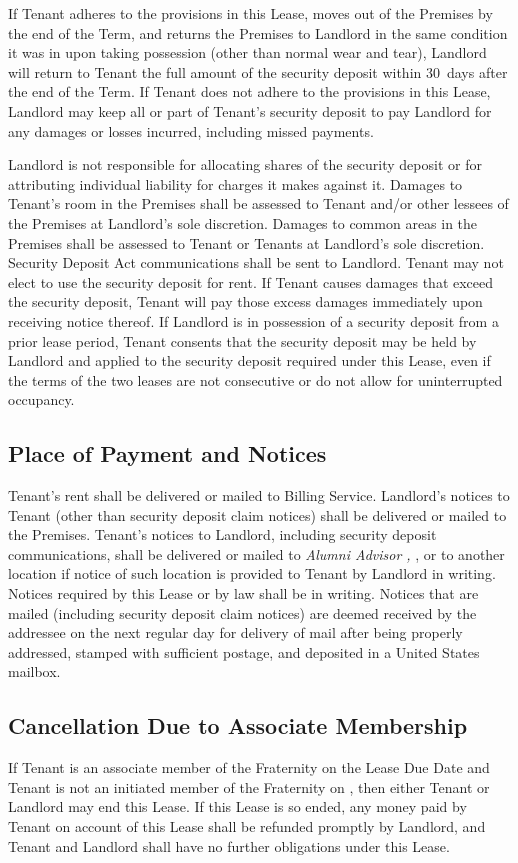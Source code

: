 \documentclass{article}
\begin{document}
If Tenant adheres to the provisions in this Lease, moves out of the Premises by
the end of the Term, and returns the Premises to Landlord in the same condition
it was in upon taking possession (other than normal wear and tear), Landlord
will return to Tenant the full amount of the security deposit within 30~days
after the end of the Term. If Tenant does not adhere to the provisions in this
Lease, Landlord may keep all or part of Tenant’s security deposit to pay
Landlord for any damages or losses incurred, including missed payments.

Landlord is not responsible for allocating shares of the security deposit or for
attributing individual liability for charges it makes against it. Damages to
Tenant’s room in the Premises shall be assessed to Tenant and/or other lessees
of the Premises at Landlord’s sole discretion. Damages to common areas in the
Premises shall be assessed to Tenant or Tenants at Landlord’s sole discretion.
Security Deposit Act communications shall be sent to Landlord. Tenant may not
elect to use the security deposit for rent. If Tenant causes damages that exceed
the security deposit, Tenant will pay those excess damages immediately upon
receiving notice thereof. If Landlord is in possession of a security deposit
from a prior lease period, Tenant consents that the security deposit may be held
by Landlord and applied to the security deposit required under this Lease, even
if the terms of the two leases are not consecutive or do not allow for
uninterrupted occupancy.

\subsection{Place of Payment and Notices}
Tenant’s rent shall be delivered or mailed to Billing Service. Landlord’s
notices to Tenant (other than security deposit claim notices) shall be delivered
or mailed to the Premises. Tenant’s notices to Landlord, including security
deposit communications, shall be delivered or mailed to \emph{Alumni Advisor
\AlumniAdvisorName, \AlumniAdvisorAddress}, or to another location if notice of
such location is provided to Tenant by Landlord in writing. Notices required by
this Lease or by law shall be in writing. Notices that are mailed (including
security deposit claim notices) are deemed received by the addressee on the next
regular day for delivery of mail after being properly addressed, stamped with
sufficient postage, and deposited in a United States mailbox.

\subsection{Cancellation Due to Associate Membership}
If Tenant is an associate member of the Fraternity on the Lease Due Date and
Tenant is not an initiated member of the Fraternity on
, then either Tenant or Landlord
may end this Lease. If this Lease is so ended, any money paid by Tenant on
account of this Lease shall be refunded promptly by Landlord, and Tenant and
Landlord shall have no further obligations under this Lease.
\end{document}
